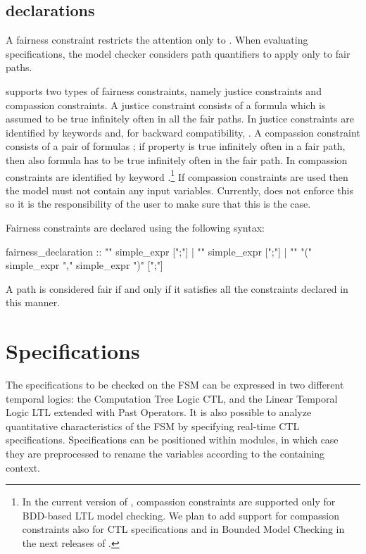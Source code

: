 \subsection{ declarations}
\label{FAIRNESS declarations}
%
A fairness constraint restricts the attention only to .  When evaluating specifications, the model checker
considers path quantifiers to apply only to fair paths.

\nusmv supports two types of fairness constraints, namely justice
constraints and compassion constraints.  A justice constraint consists
of a formula  which is assumed to be true infinitely often in
all the fair paths. In \nusmv justice constraints are identified by
keywords  and, for backward compatibility,
.  A compassion constraint consists of a pair of
formulas ; if property  is true infinitely often
in a fair path, then also formula  has to be true infinitely
often in the fair path. In \nusmv compassion constraints are
identified by keyword .\footnote{In the current
version of \nusmv, compassion constraints are supported only for
BDD-based LTL model checking. We plan to add support for compassion
constraints also for CTL specifications and in Bounded Model Checking
in the next releases of \nusmv.} If compassion constraints are used
then the model must not contain any input variables. Currently, \nusmv
does not enforce this so it is the responsibility of the user to make
sure that this is the case.

Fairness constraints are declared using the following syntax:
%
\begin{Grammar}
fairness_declaration :: 
       "" simple_expr [";"]
     | "" simple_expr [";"]
     | "" "(" simple_expr "," simple_expr ")" [";"]
\end{Grammar}
%
A path is considered fair if and only if it satisfies all the
constraints declared in this manner.

\section{Specifications}
%
The specifications to be checked on the FSM can be expressed in two
different temporal logics: the Computation Tree Logic CTL, and the
Linear Temporal Logic LTL extended with Past Operators. It is also
possible to analyze quantitative characteristics of the FSM by
specifying real-time CTL specifications. Specifications can be
positioned within modules, in which case they are preprocessed to
rename the variables according to the containing context.

